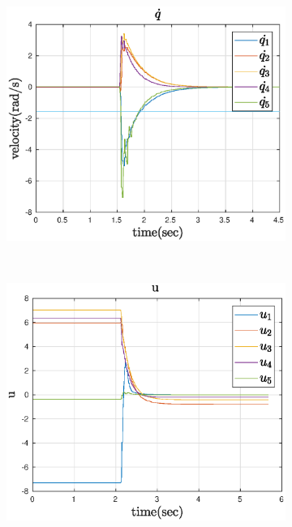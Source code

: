 \begin{figure}[htbp]
    ~
    \centering
    \begin{subfigure}[htbp]{0.45\textwidth}
        \centering
        \includegraphics[width = \picsSiz\linewidth]{img/LSqdot.eps}
        \caption{ }
        \label{fig:LSqdot}
    \end{subfigure}
    ~ 
    \begin{subfigure}[htbp]{0.45\textwidth}
        \centering
        \includegraphics[width = \picsSiz\linewidth]{img/LSu.eps}
        \caption{ }
    \end{subfigure}

\end{figure}
